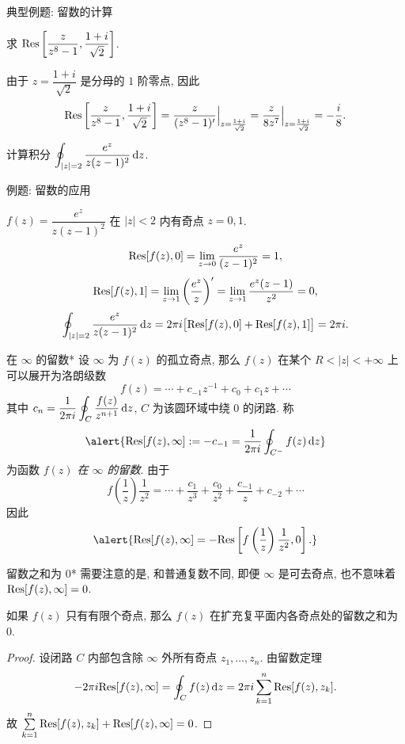 \begin{frame}{典型例题: 留数的计算}
\begin{example}
求 ${\mathrm{Res}}\left[\dfrac{z}{z^8-1},\dfrac{1+i}{\sqrt2}\right]$.
\end{example}
\begin{solution}
由于 $z=\dfrac{1+i}{\sqrt2}$ 是分母的 $1$ 阶零点,
\onslide<+->
因此
\[{\mathrm{Res}}\left[\frac z{z^8-1},\frac{1+i}{\sqrt2}\right]
=\frac z{(z^8-1)'}\Big|_{z=\frac{1+i}{\sqrt2}}
=\frac z{8z^7}\Big|_{z=\frac{1+i}{\sqrt2}}
=-\frac i8.\]
\end{solution}
\begin{example}
计算积分 $\displaystyle\oint_{|z|=2}\frac{e^z}{z(z-1)^2}\,\mathrm{d} z$.
\end{example}
\end{frame}


\begin{frame}{例题: 留数的应用}
\begin{solution}
$f(z)=\dfrac{e^z}{z(z-1)^2}$ 在 $|z|<2$ 内有奇点 $z=0,1$.
\onslide<+->
\[{\mathrm{Res}}[f(z),0]=\lim_{z\to0}\frac{e^z}{(z-1)^2}=1,\]
\onslide<+->
\[{\mathrm{Res}}[f(z),1]=\lim_{z\to1}\left(\frac{e^z}z\right)'
=\lim_{z\to1}\frac{e^z(z-1)}{z^2}=0,\]
\onslide<+->
\[\oint_{|z|=2}\frac{e^z}{z(z-1)^2}\,\mathrm{d} z
=2\pi i\bigl[{\mathrm{Res}}[f(z),0]+{\mathrm{Res}}[f(z),1]\bigr]
=2\pi i.\]
\end{solution}
\end{frame}


\begin{frame}{在 $\infty$ 的留数*}
\onslide<+->
设 $\infty$ 为 $f(z)$ 的孤立奇点,
\onslide<+->
那么 $f(z)$ 在某个 $R<|z|<+\infty$ 上可以展开为洛朗级数
\[f(z)=\cdots+c_{-1}z^{-1}+c_0+c_1z+\cdots\]
\onslide<+->
其中 $c_n=\displaystyle\frac1{2\pi i}\oint_C\frac{f(z)}{z^{n+1}}\,\mathrm{d} z$, $C$ 为该圆环域中绕 $0$ 的闭路.
\onslide<+->
称
\[\alert{\Res[f(z),\infty]:=-c_{-1}=\frac1{2\pi i}\oint_{C^-}f(z)\diff z}\]
为函数 \emph{$f(z)$ 在 $\infty$ 的留数}.
\onslide<+->
由于
\[f\left(\frac1z\right)\frac1{z^2}=\cdots+\frac{c_1}{z^3}+\frac{c_0}{z^2}+\frac{c_{-1}}z+c_{-2}+\cdots\]
\onslide<+->
因此
\[\alert{\Res[f(z),\infty]=-\Res\left[f\left(\frac1z\right)\frac1{z^2},0\right].}\]
\end{frame}


\begin{frame}{留数之和为 $0$*}
\onslide<+->
需要注意的是, 和普通复数不同, \alert{即便 $\infty$ 是可去奇点, 也不意味着 ${\mathrm{Res}}[f(z),\infty]=0$}.

\begin{theorem}
如果 $f(z)$ 只有有限个奇点, 那么 $f(z)$ 在\alert{扩充复平面内各奇点处的留数之和为 $0$}.
\end{theorem}
\begin{proof}
设闭路 $C$ 内部包含除 $\infty$ 外所有奇点 $z_1,\dots,z_n$.
\onslide<+->
由留数定理
\[-2\pi i{\mathrm{Res}}[f(z),\infty]=\oint_C f(z)\,\mathrm{d} z=2\pi i\sum_{k=1}^n{\mathrm{Res}}[f(z),z_k].\]
\onslide<+->
故 $\sum\limits_{k=1}^n{\mathrm{Res}}[f(z),z_k]+{\mathrm{Res}}[f(z),\infty]=0$.
\end{proof}
\end{frame}

